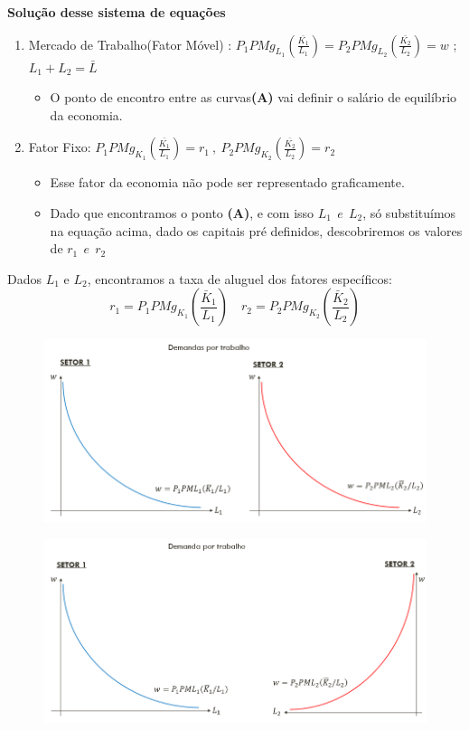\documentclass[a4paper,12pt]{article}[abntex2]
\begin{document}
\textbf{Solução desse sistema de equações}\begin{enumerate}
    \item Mercado de Trabalho(Fator Móvel) : \(P_1 PMg_{L_1} \left( \frac{\bar{K_1}}{L_1} \right) = P_2 PMg_{L_2} \left( \frac{\bar{K_2}}{L_2} \right) = w\) ; \(L_1+L_2=\bar{L}\)\begin{itemize}
        \item O ponto de encontro entre as curvas\textbf{(A)} vai definir o salário de equilíbrio da economia.
    \end{itemize}
    \item Fator Fixo: \(P_1 PMg_{K_1} \left( \frac{\bar{K_1}}{L_1} \right) = r_1 \ , \  P_2 PMg_{K_2} \left( \frac{\bar{K_2}}{L_2} \right) = r_2\)\begin{itemize}
        \item Esse fator da economia não pode ser representado graficamente.
        \item Dado que encontramos o ponto \textbf{(A)}, e com isso \(L_1 \ \ e \ \ L_2\), só substituímos na equação acima, dado os capitais pré definidos, descobriremos os valores de \(r_1 \ \ e \ \ r_2\)
    \end{itemize}
\end{enumerate}

Dados $L_1$ e $L_2$, encontramos a taxa de aluguel dos fatores específicos:
\[
r_1 = P_1 PMg_{K_1} \left( \frac{\bar{K}_1}{L_1} \right)
\quad
r_2 = P_2 PMg_{K_2} \left( \frac{\bar{K}_2}{L_2} \right)
\]

\begin{figure}[H]
    \centering
    \includegraphics[width=0.7\linewidth]{Imagens/a14i1.png}
\end{figure}

\begin{figure}[H]
    \centering
    \includegraphics[width=0.7\linewidth]{Imagens/a14i2.png}
\end{figure}
\end{document}
